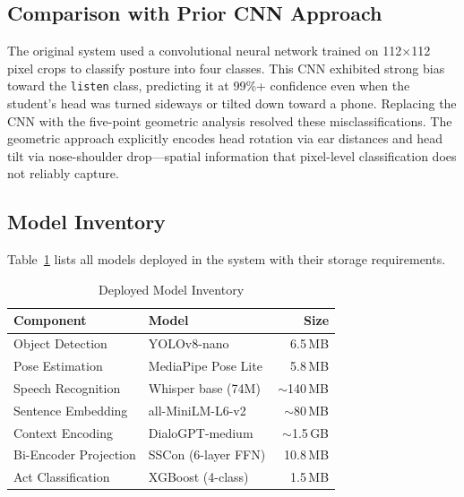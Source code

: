 \documentclass[conference]{IEEEtran}
\begin{document}
\subsection{Comparison with Prior CNN Approach}
The original system used a convolutional neural network trained on 112$\times$112 pixel crops to classify posture into four classes. This CNN exhibited strong bias toward the \texttt{listen} class, predicting it at 99\%+ confidence even when the student's head was turned sideways or tilted down toward a phone. Replacing the CNN with the five-point geometric analysis resolved these misclassifications. The geometric approach explicitly encodes head rotation via ear distances and head tilt via nose-shoulder drop---spatial information that pixel-level classification does not reliably capture.

\subsection{Model Inventory}
Table~\ref{tab:models} lists all models deployed in the system with their storage requirements.

\begin{table}[htbp]
\caption{Deployed Model Inventory}
\begin{center}
\begin{tabular}{|l|l|r|}
\hline
\textbf{Component} & \textbf{Model} & \textbf{Size} \\
\hline
Object Detection & YOLOv8-nano & 6.5\,MB \\
Pose Estimation & MediaPipe Pose Lite & 5.8\,MB \\
Speech Recognition & Whisper base (74M) & $\sim$140\,MB \\
Sentence Embedding & all-MiniLM-L6-v2 & $\sim$80\,MB \\
Context Encoding & DialoGPT-medium & $\sim$1.5\,GB \\
Bi-Encoder Projection & SSCon (6-layer FFN) & 10.8\,MB \\
Act Classification & XGBoost (4-class) & 1.5\,MB \\
\hline
\end{tabular}
\label{tab:models}
\end{center}
\end{table}

\end{document}
